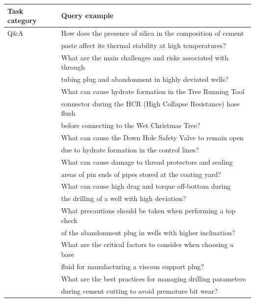             \begin{table}[h]
                \centering
                \sloppy
                \begin{tabular}{|p{2cm}|l|}
                    \hline
                    \textbf{Task category} & \textbf{Query example} \\ \hline
                    Q\&A & How does the presence of silica in the composition of cement \\
                    & paste affect its thermal stability at high temperatures? \\ 
                    & What are the main challenges and risks associated with through \\
                    & tubing plug and abandonment in highly deviated wells? \\ 
                    
                    & What can cause hydrate formation in the Tree Running Tool \\
                    & connector during the HCR (High Collapse Resistance) hose flush \\
                    & before connecting to the Wet Christmas Tree? \\ 
                    & What can cause the Down Hole Safety Valve to remain open \\
                    & due to hydrate formation in the control lines? \\ 
                    & What can cause damage to thread protectors and sealing \\
                    & areas of pin ends of pipes stored at the coating yard? \\ 
                    & What can cause high drag and torque off-bottom during \\
                    & the drilling of a well with high deviation? \\ 
                    & What precautions should be taken when performing a top check \\
                    & of the abandonment plug in wells with higher inclination? \\ 
                    & What are the critical factors to consider when choosing a base \\
                    & fluid for manufacturing a viscous support plug? \\ 
                    & What are the best practices for managing drilling parameters \\
                    & during cement cutting to avoid premature bit wear? \\ 
                    \hline
                    

\end{tabular}
\end{table}
